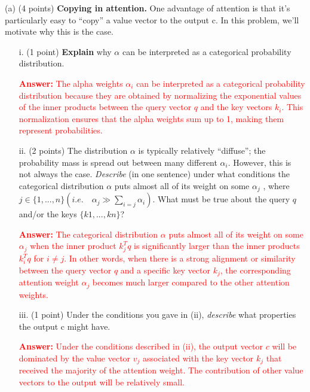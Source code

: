 \documentclass[letterpaper,12pt]{article}
\begin{document}
	\noindent(a) (4 points) \textbf{Copying in attention.} One advantage of attention is that it’s particularly easy to “copy” a value vector to the output c. In this problem, we’ll motivate why this is the case.
		
		\begin{itemize}
			\item [i.]
			(1 point) \textbf{Explain} why $\alpha$ can be interpreted as a categorical probability distribution.
			
			\textcolor{red}{\textbf{Answer:} The alpha weights $\alpha_i$ can be interpreted as a categorical probability distribution because they are obtained by normalizing the exponential values of the inner products between the query vector $q$ and the key vectors $k_i$. This normalization ensures that the alpha weights sum up to 1, making them represent probabilities.}
		\end{itemize}
	
		\begin{itemize}
			\item [ii.]
			(2 points) The distribution $\alpha$ is typically relatively “diffuse”; the probability mass is spread out between many different $\alpha_i$. However, this is not always the case. \textit{Describe} (in one sentence) under what conditions the categorical distribution $\alpha$ puts almost all of its weight on some $\alpha_j$ , where $j \in \{1, . . . , n\} (i.e. \quad \alpha_j ≫ \sum_{i=j} \alpha_i)$. What must be true about the query $q$ and/or the keys $\{k1, . . . , kn\}$?
			
			\textcolor{red}{\textbf{Answer:} The categorical distribution $\alpha$ puts almost all of its weight on some $\alpha_j$ when the inner product $k_j^Tq$ is significantly larger than the inner products $k_i^Tq$ for $i\neq j$. In other words, when there is a strong alignment or similarity between the query vector $q$ and a specific key vector $k_j$, the corresponding attention weight $\alpha_j$ becomes much larger compared to the other attention weights.}
		\end{itemize}

		\begin{itemize}
			\item [iii.]
			(1 point) Under the conditions you gave in (ii), \textit{describe} what properties the output c might have.
			
			\textcolor{red}{\textbf{Answer:} Under the conditions described in (ii), the output vector $c$ will be dominated by the value vector $v_j$ associated with the key vector $k_j$ that received the majority of the attention weight. The contribution of other value vectors to the output will be relatively small.}
		\end{itemize}
\end{document}
